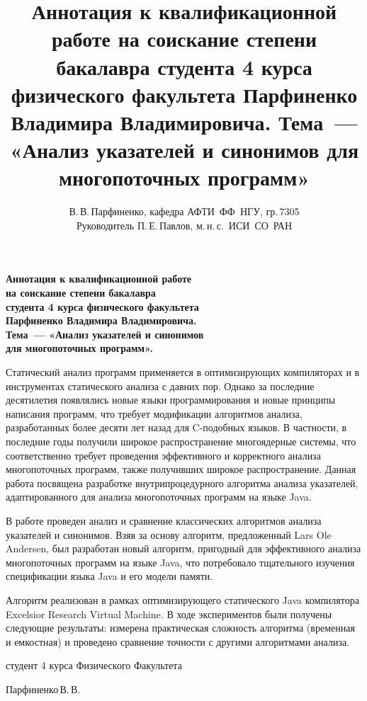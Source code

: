 \documentclass[12pt]{article}
\title{
  Аннотация к квалификационной работе на соискание степени бакалавра студента 4
  курса физического факультета Парфиненко Владимира Владимировича.
  Тема~--- «Анализ указателей и синонимов для многопоточных программ»
}
\author{
  В.\,В.\,Парфиненко, кафедра АФТИ~ФФ~НГУ, гр.\,7305\\
  Руководитель П.\,Е.\,Павлов, м.\,н.\,с.~ИСИ~СО~РАН
}
\newcommand{\eng}[1]{{\English#1}}
\begin{document}
  \thispagestyle{empty}

  \begin{center}
    \bfseries
    Аннотация к квалификационной работе\\
    на соискание степени бакалавра\\
    студента 4 курса физического факультета\\
    Парфиненко Владимира Владимировича.\\
    Тема~--- «Анализ указателей и синонимов\\
    для многопоточных программ».
  \end{center}
  \vspace{0.5cm}

  Статический анализ программ применяется в оптимизирующих компиляторах и в
  инструментах статического анализа с давних пор. Однако за последние
  десятилетия появлялись новые языки программирования и новые принципы
  написания программ, что требует модификации алгоритмов анализа, разработанных
  более десяти лет назад для \eng{C}-подобных языков. В частности, в последние
  годы получили широкое распространение многоядерные системы, что
  соответственно требует проведения эффективного и корректного анализа
  многопоточных программ, также получивших широкое распространение.
  Данная работа посвящена разработке внутрипроцедурного алгоритма анализа
  указателей, адаптированного для анализа многопоточных программ на языке
  \eng{Java}.

  В работе проведен анализ и сравнение классических алгоритмов анализа
  указателей и синонимов. Взяв за основу алгоритм, предложенный \eng{Lars Ole
  Andersen}, был разработан новый алгоритм, пригодный для эффективного анализа
  многопоточных программ на языке \eng{Java}, что потребовало тщательного
  изучения спецификации языка \eng{Java} и его модели памяти.

  Алгоритм реализован в рамках оптимизирующего статического \eng{Java}
  компилятора \eng{Excelsior Research Virtual Machine}. В ходе экспериментов
  были получены следующие результаты: измерена практическая сложность алгоритма
  (временная и емкостная) и проведено сравнение точности с другими алгоритмами
  анализа.

  \vspace{0.5cm}

  \begin{flushright}

    студент 4 курса Физического Факультета

    Парфиненко\,В.\,В.

  \end{flushright}
\end{document}
